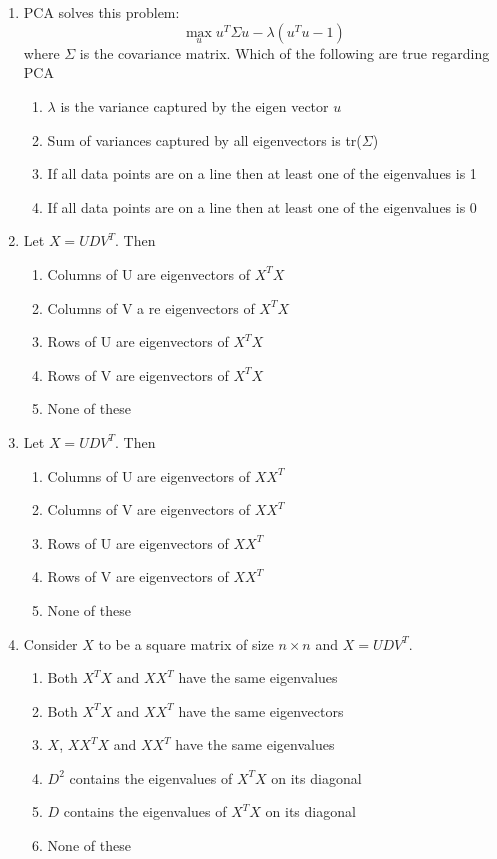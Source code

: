 \documentclass{article}
\begin{document}
\begin{enumerate}
    \item PCA solves this problem:
    \[\max_u u^T \Sigma u - \lambda (u^Tu-1)\]
    where $\Sigma$ is the covariance matrix.
    Which of the following are true regarding PCA
    \begin{enumerate}
        \item $\lambda$ is the variance captured by the eigen vector $u$
        \item Sum of variances captured by all eigenvectors is tr($\Sigma$)
        \item If all data points are on a line then at least one of the eigenvalues is 1
        \item If all data points are on a line then at least one of the eigenvalues is 0
    \end{enumerate}


    \item Let $X=UDV^T$. Then
    \begin{enumerate}
        \item Columns of U are eigenvectors of $X^TX$
        \item Columns of V a re eigenvectors of $X^TX$
        \item Rows of U are eigenvectors of $X^TX$
        \item Rows of V are eigenvectors of $X^TX$
        \item None of these
    \end{enumerate}

    \item Let $X=UDV^T$. Then
    \begin{enumerate}
        \item Columns of U are eigenvectors of $XX^T$
        \item Columns of V are eigenvectors of $XX^T$
        \item Rows of U are eigenvectors of $XX^T$
        \item Rows of V are eigenvectors of $XX^T$
        \item None of these
    \end{enumerate}

    \item Consider $X$ to be a square matrix of size $n\times n$ and $X=UDV^T$.
    \begin{enumerate}
        \item Both $X^TX$ and $XX^T$ have the same eigenvalues
        \item Both $X^TX$ and $XX^T$ have the same eigenvectors
        \item $X$, $XX^TX$ and $XX^T$ have the same eigenvalues
        \item $D^2$ contains the eigenvalues of $X^TX$ on its diagonal
        \item $D$ contains the eigenvalues of $X^TX$ on its diagonal
        \item None of these
    \end{enumerate}


\end{enumerate}
\end{document}
